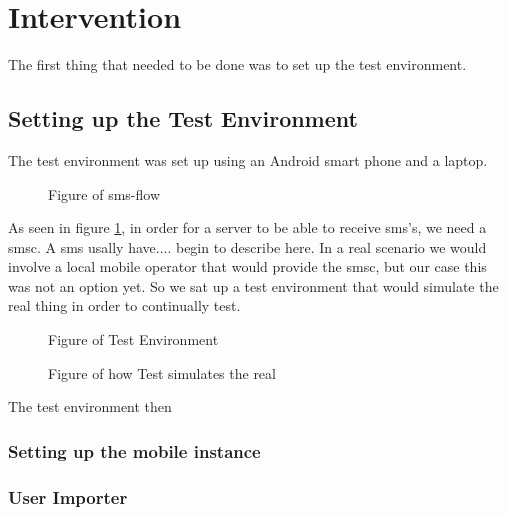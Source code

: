 \section{Intervention}
The first thing that needed to be done was to set up the test environment. 


\subsection{Setting up the Test Environment}
The test environment was set up using an Android smart phone and a laptop. 

\begin{figure}
\centering
\caption{Figure of \gls{sms}-flow}

\label{fig:smsFlow} 
\end{figure} 
As seen in figure \ref{fig:smsFlow}, in order for a server to be able to receive \gls{sms}'s, we need a \gls{smsc}. 
A \gls{sms} usally have.... begin to describe here.
In a real scenario we would involve a local mobile operator that would provide the \gls{smsc}, but our case this was not an option yet. 
So we sat up a test environment that would simulate the real thing in order to continually test.

\begin{figure}
\centering

\caption{Figure of Test Environment}
\label{fig:testEnvironment} 
\end{figure}


\begin{figure}
\centering

\caption{Figure of how Test simulates the real}
\label{fig:testConvertReal}
\end{figure}
The test environment then 

\subsubsection{Setting up the mobile instance}

\subsubsection{User Importer}

